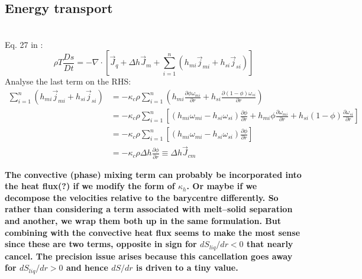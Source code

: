 \subsection{Energy transport}
\\

\noindent
Eq. 27 in \cite{ABE95}:
\begin{equation}
\rho T \frac{Ds}{Dt} = -\nabla \cdot \left[ \vec{J}_q + \Delta h \vec{J}_m + \sum_{i=1}^n (h_{mi} \vec{j}_{mi} + h_{si}\vec{j}_{si}) \right]
\end{equation}
Analyse the last term on the RHS:
\begin{align}
\sum_{i=1}^n (h_{mi} \vec{j}_{mi} + h_{si}\vec{j}_{si}) &= -\kappa_c \rho \sum_{i=1}^n \left(h_{mi} \frac{\partial \phi \omega_{mi}}{\partial r} + h_{si} \frac{\partial (1-\phi) \omega_{si}}{\partial r} \right)\\
&= -\kappa_c \rho \sum_{i=1}^n \left[ (h_{mi} \omega_{mi} - h_{si} \omega_{si})\frac{\partial \phi}{\partial r} + h_{mi} \phi \frac{\partial \omega_{mi}}{\partial r} + h_{si} (1-\phi) \frac{\partial \omega_{si}}{\partial r} \right]\\
&= -\kappa_c \rho \sum_{i=1}^n \left[ (h_{mi} \omega_{mi} - h_{si} \omega_{si})\frac{\partial \phi}{\partial r} \right]\\
&= -\kappa_c \rho \Delta h \frac{\partial \phi}{\partial r} \equiv \Delta h \vec{J}_{cm}
\end{align}

\textbf{The convective (phase) mixing term can probably be incorporated into the heat flux(?) if we modify the form of $\kappa_h$.  Or maybe if we decompose the velocities relative to the barycentre differently.  So rather than considering a term associated with melt--solid separation and another, we wrap them both up in the same formulation.  But combining with the convective heat flux seems to make the most sense since these are two terms, opposite in sign for $dS_{liq}/dr<0$ that nearly cancel.  The precision issue arises because this cancellation goes away for $dS_{liq}/dr>0$ and hence $dS/dr$ is driven to a tiny value.}
